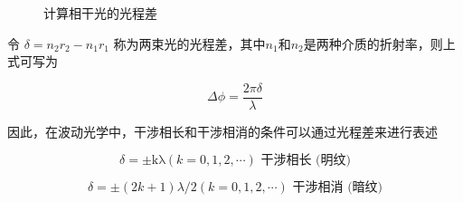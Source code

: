 \documentclass[withoutpreface,bwprint]{cumcmthesis} %
\begin{document}
\begin{appendices}
\begin{figure}[ht]
        \caption{计算相干光的光程差}
        \label{fig:3}
    \end{figure}
    令 $\delta = n_2 r_2 - n_1 r_1$ 称为两束光的光程差，其中$n_1$和$n_2$是两种介质的折射率，则上式可写为


    \[\Delta\phi = \frac{2 \pi\delta }{\lambda}\]


    因此，在波动光学中，干涉相长和干涉相消的条件可以通过光程差来进行表述

    \[\delta = \pm \text{kλ}(k = 0,1,2,\cdots)\text{~}\text{干涉相长}\text{\ (}\text{明纹}\text{)}\]

    \[\delta = \pm (2k + 1)\lambda/2(k = 0,1,2,\cdots)\text{~}\text{干涉相消}\text{\ (}\text{暗纹}\text{)}\]


\end{appendices}
\end{document}
